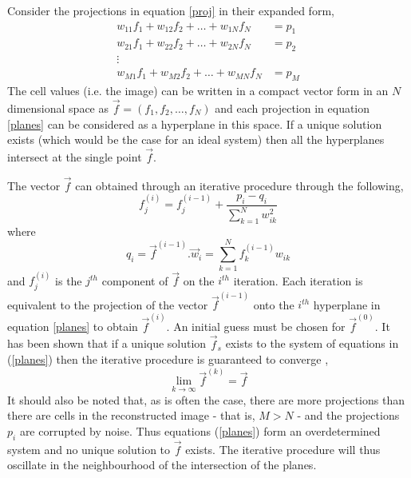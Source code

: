 \documentclass[11pt,a4paper]{article}
\begin{document}
Consider the projections in equation \ref{proj} in their expanded form,
\begin{equation}
\begin{aligned}
w_{11}f_{1} + w_{12}f_{2} + \ldots + w_{1N} f_{N} & =  p_{1} \\
w_{21}f_{1} + w_{22}f_{2} + \ldots + w_{2N} f_{N} & =  p_{2} \\
\vdots \\
w_{M1}f_{1} + w_{M2}f_{2} + \ldots + w_{MN} f_{N} & =  p_{M} 
\label{planes}
\end{aligned}
\end{equation}
The cell values (i.e. the image) can be written in a compact vector form in an $N$ dimensional space as $\vec{f} = (f_{1}, f_{2}, \ldots, f_{N})$ and each projection in equation \ref{planes} can be considered as a hyperplane in this space. If a unique solution exists (which would be the case for an ideal system) then all the hyperplanes intersect at the single point $\vec{f}$.

The vector $\vec{f}$ can obtained through an iterative procedure through the following,
\begin{equation}
f_{j}^{(i)} = f_{j}^{(i-1)} + \frac{p_i - q_i}{\sum_{k=1}^N w_{ik}^2}
\label{ART}	
\end{equation}
where
\begin{equation}
q_{i} = \vec{f}^{(i-1)} . \vec{w}_{i} = \sum_{k=1}^N f_{k}^{(i-1)}w_{ik}
\end{equation}
and $f_{j}^{(i)}$ is the $j^{th}$ component of $\vec{f}$ on the $i^{th}$ iteration. Each iteration is equivalent to the projection of the vector $\vec{f}^{(i-1)}$ onto the $i^{th}$ hyperplane in equation \ref{planes} to obtain $\vec{f}^{(i)}$. An initial guess must be chosen for $\vec{f}^{(0)}$. It has been shown that if a unique solution $\vec{f}_{s}$ exists to the system of equations in (\ref{planes}) then the iterative procedure is guaranteed to converge \cite{tanabe1971projection},
\begin{equation}
\lim_{k \to \infty} \vec{f}^{(k)} = \vec{f}
\end{equation}
It should also be noted that, as is often the case, there are more projections than there are cells in the reconstructed image - that is, $M > N$ - and the projections $p_i$ are corrupted by noise. Thus equations (\ref{planes}) form an overdetermined system and no unique solution to $\vec{f}$ exists. The iterative procedure will thus oscillate in the neighbourhood of the intersection of the planes.
\end{document}
